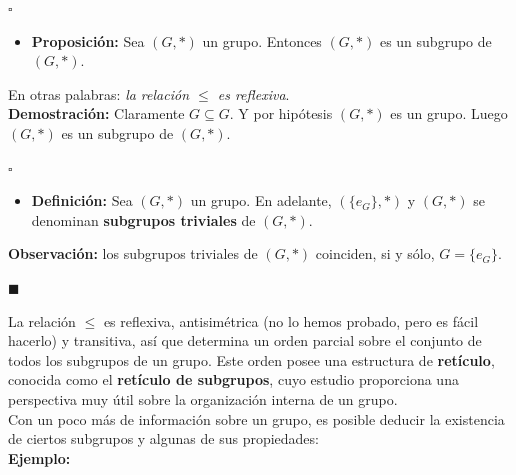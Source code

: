 \documentclass[10 pt]{article}
\begin{document}
\begin{flushright}
    $\square$
\end{flushright}

\begin{itemize}
    \item \Large{\textbf{Proposición:} Sea $(G,*)$ un grupo. Entonces $(G,*)$ es un subgrupo de $(G,*)$.} \\
\end{itemize}

\Large{En otras palabras: \textit{la relación $\leq$ es reflexiva}.} \\

\Large{\textbf{Demostración:} Claramente $G \subseteq G$. Y por hipótesis $(G,*)$ es un grupo. Luego $(G,*)$ es un subgrupo de $(G,*)$.} \\

\begin{flushright}
    $\square$
\end{flushright}

\begin{itemize}
    \item \Large{\textbf{Definición:} Sea $(G,*)$ un grupo. En adelante, $(\{e_G\},*)$ y $(G,*)$ se denominan \textbf{subgrupos triviales} de $(G,*)$.} \\
\end{itemize}

\Large{\textbf{Observación:} los subgrupos triviales de $(G,*)$ coinciden, si y sólo, $G=\{e_G\}$.} \\

\begin{flushright}
    $\blacksquare$
\end{flushright}

\Large{La relación $\leq$ es reflexiva, antisimétrica (no lo hemos probado, pero es fácil hacerlo) y transitiva, así que determina un orden parcial sobre el conjunto de todos los subgrupos de un grupo. Este orden posee una estructura de \textbf{retículo}, conocida como el \textbf{retículo de subgrupos}, cuyo estudio proporciona una perspectiva muy útil sobre la organización interna de un grupo.} \\

\Large{Con un poco más de información sobre un grupo, es posible deducir la existencia de ciertos subgrupos y algunas de sus propiedades:} \\

\Large{\textbf{Ejemplo:}} \\
\end{document}
